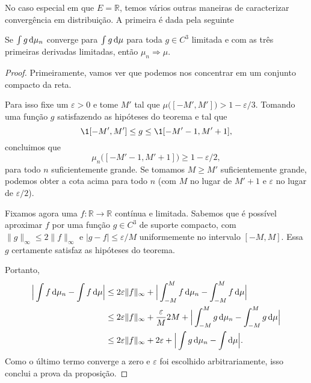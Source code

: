 No caso especial em que $E = \mathbb{R}$, temos vários outras maneiras de caracterizar convergência em distribuição.
A primeira é dada pela seguinte

\begin{proposition}
  \label{p:conv_distr_suave}
  Se $\int g \mathop{}\!\mathrm{d} \mu_n$ converge para $\int g \mathop{}\!\mathrm{d} \mu$ para toda $g \in C^3$ limitada e com as três primeiras derivadas limitadas, então $\mu_n \Rightarrow \mu$.
\end{proposition}

\begin{proof}
  Primeiramente, vamos ver que podemos nos concentrar em um conjunto compacto da reta.

  Para isso fixe um $\varepsilon > 0$ e tome $M'$ tal que $\mu\big( [-M', M'] \big) > 1 - \varepsilon / 3$.
  Tomando uma função $g$ satisfazendo as hipóteses do teorema e tal que
  \begin{equation}
    \1{[-M',M']} \leq g \leq \1{[-M'-1,M'+1]},
  \end{equation}
  concluimos que
  \begin{equation}
    \mu_n \big( [-M'-1, M'+1] \big) \geq 1 - \varepsilon/2,
  \end{equation}
  para todo $n$ suficientemente grande.
  Se tomamos $M \geq M'$ suficientemente grande, podemos obter a cota acima para todo $n$ (com $M$ no lugar de $M'+1$ e $\varepsilon$ no lugar de $\varepsilon/2$).

  Fixamos agora uma $f: \mathbb{R} \to \mathbb{R}$ contínua e limitada.
  Sabemos que é possível aproximar $f$ por uma função $g \in C^3$ de suporte compacto, com $\lVert g \rVert_\infty \leq 2 \lVert f \rVert_\infty$ e $|g - f| \leq \varepsilon/M$ uniformemente no intervalo $[-M,M]$.
  Essa $g$ certamente satisfaz as hipóteses do teorema.

  Portanto,
  \begin{equation*}
    \begin{split}
      \Big| \int f \d \mu_n - \int f \d \mu\Big| & \leq 2 \varepsilon \lVert f \rVert_\infty + \Big| \int_{-M}^M f \d \mu_n - \int_{-M}^M f \d \mu\Big|\\
      & \leq 2 \varepsilon \lVert f \rVert_\infty + \frac \varepsilon{M} 2 M + \Big| \int_{-M}^M g \d \mu_n - \int_{-M}^M g \d \mu\Big|\\
      & \leq 2 \varepsilon \lVert f \rVert_\infty + 2 \varepsilon + \Big| \int g \d \mu_n - \int \d \mu\Big|.
    \end{split}
  \end{equation*}
  Como o último termo converge a zero e $\varepsilon$ foi escolhido arbitrariamente, isso conclui a prova da proposição.
\end{proof}

